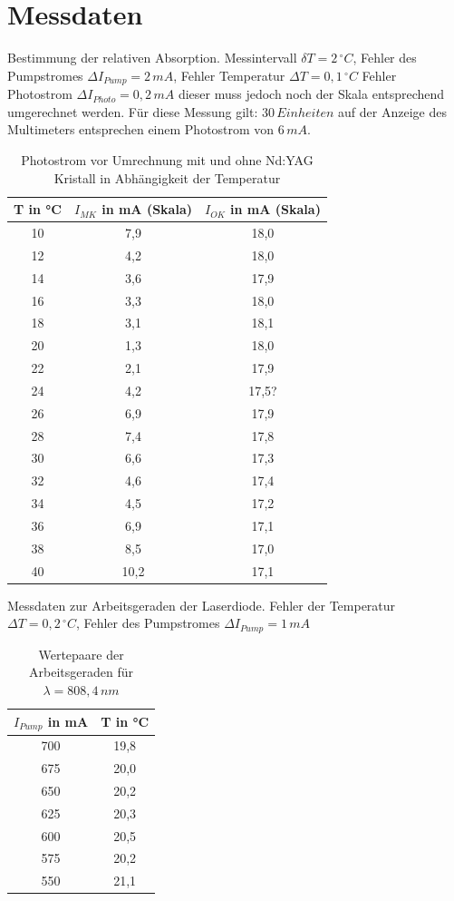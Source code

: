 \documentclass[twoside,colorback,accentcolor=tud4c,11pt]{tudreport}
\begin{document}
\chapter{Messdaten}
Bestimmung der relativen Absorption. Messintervall $\delta T=2\,\si{^\circ C}$, Fehler des Pumpstromes $\Delta I_{Pump}=2\,\si{mA}$, Fehler Temperatur $\Delta T=0,1\,\si{^\circ C}$ Fehler Photostrom $\Delta I_{Photo}=0,2\,\si{mA}$ dieser muss jedoch noch der Skala entsprechend umgerechnet werden. Für diese Messung gilt: $30\,\si{Einheiten}$ auf der Anzeige des Multimeters entsprechen einem Photostrom von $6\,\si{mA}$.
\begin{table}[H]
\renewcommand*{\arraystretch}{1.2}
\centering
\begin{tabular}{|c|c|c|}
\hline 
T in °C & $I_{MK}$ in mA (Skala) & $I_{OK}$ in mA (Skala)\\
\hline 
10 & 7,9 & 18,0 \\ 
\hline 
12 & 4,2 & 18,0 \\ 
\hline 
14 & 3,6 & 17,9 \\ 
\hline 
16 & 3,3 & 18,0 \\ 
\hline 
18 & 3,1 & 18,1 \\ 
\hline
20 & 1,3 & 18,0 \\ 
\hline
22 & 2,1 & 17,9 \\ 
\hline
24 & 4,2 & 17,5? \\ 
\hline
26 & 6,9 & 17,9 \\ 
\hline
28 & 7,4 & 17,8 \\ 
\hline
30 & 6,6 & 17,3 \\ 
\hline
32 & 4,6 & 17,4 \\ 
\hline
34 & 4,5 & 17,2 \\ 
\hline
36 & 6,9 & 17,1 \\ 
\hline
38 & 8,5 & 17,0 \\ 
\hline
40 & 10,2 & 17,1 \\ 
\hline
\end{tabular} 
\caption{Photostrom vor Umrechnung mit und ohne Nd:YAG Kristall in Abhängigkeit der Temperatur}\label{relabs}
\end{table}

Messdaten zur Arbeitsgeraden der Laserdiode. Fehler der Temperatur $\Delta T=0,2\,\si{^\circ C}$, Fehler des Pumpstromes $\Delta I_{Pump}=1\,\si{mA}$

\begin{table}[H]
\renewcommand*{\arraystretch}{1.2}
\centering
\begin{tabular}{|c|c|}
\hline 
$I_{Pump}$ in mA & T in °C\\
\hline 
700 & 19,8  \\ 
\hline 
675 & 20,0  \\ 
\hline 
650 & 20,2  \\ 
\hline 
625 & 20,3  \\ 
\hline 
600 & 20,5  \\ 
\hline
575 & 20,2 \\ 
\hline
550 & 21,1 \\ 
\hline
\end{tabular} 
\caption{Wertepaare der Arbeitsgeraden für $\lambda =808,4\,\si{nm}$}\label{arbger}
\end{table}
\end{document}
